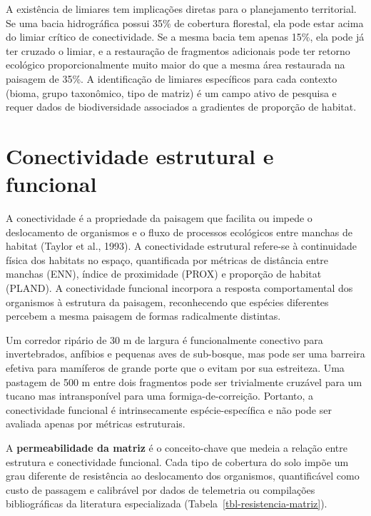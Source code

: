 \documentclass[
  portuguese,
  11pt,
  a4paper,
  open=any]{scrbook}
\begin{document}
A existência de limiares tem implicações diretas para o planejamento
territorial. Se uma bacia hidrográfica possui 35\% de cobertura
florestal, ela pode estar acima do limiar crítico de conectividade. Se a
mesma bacia tem apenas 15\%, ela pode já ter cruzado o limiar, e a
restauração de fragmentos adicionais pode ter retorno ecológico
proporcionalmente muito maior do que a mesma área restaurada na paisagem
de 35\%. A identificação de limiares específicos para cada contexto
(bioma, grupo taxonômico, tipo de matriz) é um campo ativo de pesquisa e
requer dados de biodiversidade associados a gradientes de proporção de
habitat.

\section{Conectividade estrutural e
funcional}\label{conectividade-estrutural-e-funcional}

A conectividade é a propriedade da paisagem que facilita ou impede o
deslocamento de organismos e o fluxo de processos ecológicos entre
manchas de habitat (Taylor et al., 1993). A conectividade estrutural
refere-se à continuidade física dos habitats no espaço, quantificada por
métricas de distância entre manchas (ENN), índice de proximidade (PROX)
e proporção de habitat (PLAND). A conectividade funcional incorpora a
resposta comportamental dos organismos à estrutura da paisagem,
reconhecendo que espécies diferentes percebem a mesma paisagem de formas
radicalmente distintas.

Um corredor ripário de 30 m de largura é funcionalmente conectivo para
invertebrados, anfíbios e pequenas aves de sub-bosque, mas pode ser uma
barreira efetiva para mamíferos de grande porte que o evitam por sua
estreiteza. Uma pastagem de 500 m entre dois fragmentos pode ser
trivialmente cruzável para um tucano mas intransponível para uma
formiga-de-correição. Portanto, a conectividade funcional é
intrinsecamente espécie-específica e não pode ser avaliada apenas por
métricas estruturais.

A \textbf{permeabilidade da matriz} é o conceito-chave que medeia a
relação entre estrutura e conectividade funcional. Cada tipo de
cobertura do solo impõe um grau diferente de resistência ao deslocamento
dos organismos, quantificável como custo de passagem e calibrável por
dados de telemetria ou compilações bibliográficas da literatura
especializada (Tabela~\ref{tbl-resistencia-matriz}).
\end{document}
